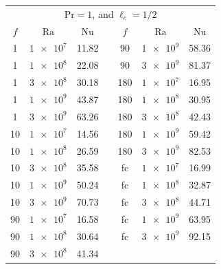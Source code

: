 \documentclass{jfm}
\begin{document}
\begin{center}
\begin{tabular}{ccccccc}
\toprule
\multicolumn{7}{c}{$\text{Pr}=1$, and $\ell_c=1/2$} \\
	$f$ & $\text{Ra}$ & $\text{Nu}$ & &
	$f$ & $\text{Ra}$ & $\text{Nu}$ \\
\midrule
    1 & $\num{1e7}$ & 11.82 & & 90 & $\num{1e9}$ & 58.36 \\
    1 & $\num{1e8}$ & 22.08 & & 90 & $\num{3e9}$ & 81.37 \\
    1 & $\num{3e8}$ & 30.18 & & 180 & $\num{1e7}$ & 16.95 \\
    1 & $\num{1e9}$ & 43.87 & & 180 & $\num{1e8}$ & 30.95 \\
    1 & $\num{3e9}$ & 63.26 & & 180 & $\num{3e8}$ & 42.43 \\
	10 & $\num{1e7}$ & 14.56 & & 180 & $\num{1e9}$ & 59.42 \\
	10 & $\num{1e8}$ & 26.59 & & 180 & $\num{3e9}$ & 82.53 \\
	10 & $\num{3e8}$ & 35.58 & & fc & $\num{1e7}$ & 16.99 \\
	10 & $\num{1e9}$ & 50.24 & & fc & $\num{1e8}$ & 32.87 \\
	10 & $\num{3e9}$ & 70.73 & & fc & $\num{3e8}$ & 44.71 \\
	90 & $\num{1e7}$ & 16.58 & & fc & $\num{1e9}$ &  63.95 \\
	90 & $\num{1e8}$ & 30.64 & & fc & $\num{3e9}$ &  92.15 \\
	90 & $\num{3e8}$ & 41.34 & & & & \\
\bottomrule
\end{tabular}
\end{center}
\end{document}
